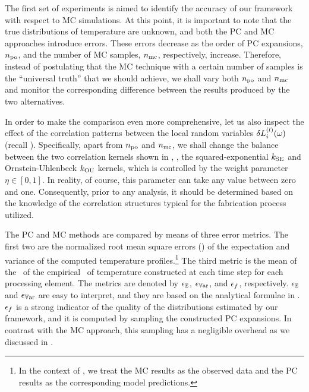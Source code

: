 The first set of experiments is aimed to identify the accuracy of our framework with respect to MC simulations.
At this point, it is important to note that the true distributions of temperature are unknown, and both the PC and MC approaches introduce errors.
These errors decrease as the order of PC expansions, ${n_\text{po}}$, and the number of MC samples, ${n_\text{mc}}$, respectively, increase.
Therefore, instead of postulating that the MC technique with a certain number of samples is the ``universal truth'' that we should achieve, we shall vary both ${n_\text{po}}$ and ${n_\text{mc}}$ and monitor the corresponding difference between the results produced by the two alternatives.

In order to make the comparison even more comprehensive, let us also inspect the effect of the correlation patterns between the local random variables $\delta L^{(l)}_i(\omega)$ (recall ).
Specifically, apart from ${n_\text{po}}$ and ${n_\text{mc}}$, we shall change the balance between the two correlation kernels shown in , \ie, the squared-exponential $\fCorr_\SE$ and Ornstein-Uhlenbeck $\fCorr_\OU$ kernels, which is controlled by the weight parameter $\eta \in [0, 1]$.
In reality, of course, this parameter can take any value between zero and one.
Consequently, prior to any analysis, it should be determined based on the knowledge of the correlation structures typical for the fabrication process utilized.

The PC and MC methods are compared by means of three error metrics.
The first two are the normalized root mean square errors (\nrmses) of the expectation and variance of the computed temperature profiles.\footnote{In the context of \nrmses, we treat the MC results as the observed data and the PC results as the corresponding model predictions.}
The third metric is the mean of the \nrmses\ of the empirical \pdfs\ of temperature constructed at each time step for each processing element.
The metrics are denoted by $\epsilon_\mathbb{E}$, $\epsilon_{\mathbb{V}\text{ar}}$, and $\epsilon_f$, respectively.
$\epsilon_\mathbb{E}$ and $\epsilon_{\mathbb{V}\text{ar}}$ are easy to interpret, and they are based on the analytical formulae in .
$\epsilon_f$ is a strong indicator of the quality of the distributions estimated by our framework, and it is computed by sampling the constructed PC expansions.
In contrast with the MC approach, this sampling has a negligible overhead as we discussed in .

